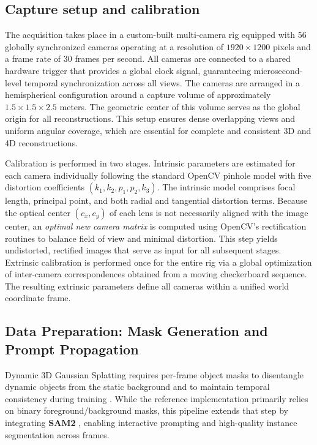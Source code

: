\subsection{Capture setup and calibration}
The acquisition takes place in a custom-built multi-camera rig equipped with 56 globally synchronized cameras operating at a resolution of \(1920 \times 1200\) pixels and a frame rate of 30 frames per second. 
All cameras are connected to a shared hardware trigger that provides a global clock signal, guaranteeing microsecond-level temporal synchronization across all views.
The cameras are arranged in a hemispherical configuration around a capture volume of approximately \(1.5 \times 1.5 \times 2.5\) meters.
The geometric center of this volume serves as the global origin for all reconstructions.
This setup ensures dense overlapping views and uniform angular coverage, which are essential for complete and consistent 3D and 4D reconstructions.

Calibration is performed in two stages. Intrinsic parameters are estimated for each camera individually following the standard OpenCV pinhole model with five distortion coefficients \((k_1, k_2, p_1, p_2, k_3)\). The intrinsic model comprises focal length, principal point, and both radial and tangential distortion terms.
Because the optical center \((c_x, c_y)\) of each lens is not necessarily aligned with the image center, an \emph{optimal new camera matrix} is computed using OpenCV’s rectification routines to balance field of view and minimal distortion. This step yields undistorted, rectified images that serve as input for all subsequent stages.
Extrinsic calibration is performed once for the entire rig via a global optimization of inter-camera correspondences obtained from a moving checkerboard sequence. 
The resulting extrinsic parameters define all cameras within a unified world coordinate frame.  

\subsection{Data Preparation: Mask Generation and Prompt Propagation}
\label{sec:maskgen}

Dynamic 3D Gaussian Splatting requires per-frame object masks to disentangle dynamic objects from the static background and to maintain temporal consistency during training \cite{luiten2024dynamic}. While the reference implementation primarily relies on binary foreground/background masks, this pipeline extends that step by integrating \textbf{SAM2} \cite{ravi2024sam2}, enabling interactive prompting and high-quality instance segmentation across frames.

